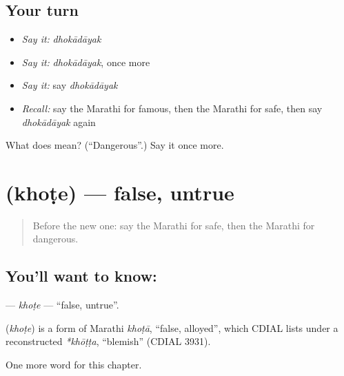 \subsection*{Your turn}
\begin{itemize}
\raggedright
  \item \emph{Say it:} \emph{dhokādāyak}
  \item \emph{Say it:} \emph{dhokādāyak}, once more
  \item \emph{Say it:} say \emph{dhokādāyak}
  \item \emph{Recall:} say the Marathi for famous, then the Marathi for safe, then say \emph{dhokādāyak} again
\end{itemize}

\begin{tcolorbox}[breakable,colback=teal!4,colframe=teal!35!black,title={Before you move on}]
What does  mean? (\textquotedblleft{}Dangerous\textquotedblright{}.) Say it once more.
\end{tcolorbox}
\section[\texorpdfstring{\mr{खोटे} (khoṭe)}{खोटे (khoṭe)}]{ (khoṭe) — false, untrue}

\label{lesson:MR-C152-khote}



\begin{quote}
Before the new one: say the Marathi for safe, then the Marathi for dangerous.
\end{quote}

\subsection*{You'll want to know: }
\textbf{} — \emph{khoṭe} — \textquotedblleft{}false, untrue\textquotedblright{}.

\begin{cousinweb}
\textbf{} (\emph{khoṭe}) is a form of Marathi \emph{khoṭā}, \textquotedblleft{}false, alloyed\textquotedblright{}, which CDIAL lists under a reconstructed \emph{*khōṭṭa}, \textquotedblleft{}blemish\textquotedblright{} (CDIAL 3931).
\end{cousinweb}

\begin{grammarlens}[title={What you've built}]
One more word for this chapter.
\end{grammarlens}

